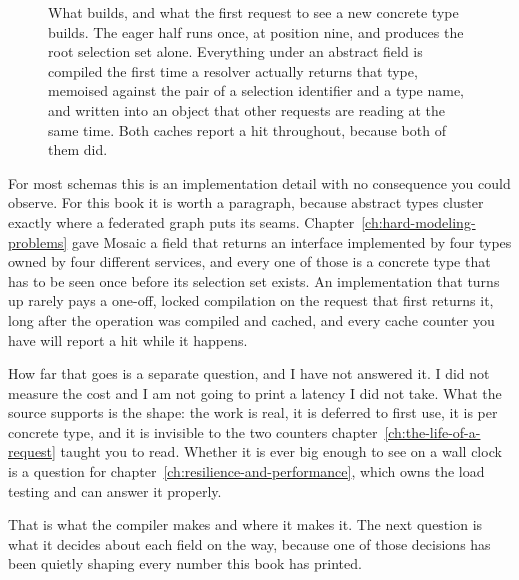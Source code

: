 \begin{figure}[htbp]
  \centering
  
  \caption{What  builds, and what the first request to see a new
  concrete type builds. The eager half runs once, at position nine, and produces
  the root selection set alone. Everything under an abstract field is compiled
  the first time a resolver actually returns that type, memoised against the
  pair of a selection identifier and a type name, and written into an object
  that other requests are reading at the same time. Both caches report a hit
  throughout, because both of them did.}
  \label{fig:ch16-lazy-compilation}
\end{figure}

%
For most schemas this is an implementation detail with no consequence you could
observe. For this book it is worth a paragraph, because abstract types cluster
exactly where a federated graph puts its seams.
Chapter~\ref{ch:hard-modeling-problems} gave Mosaic a  field that
returns an interface implemented by four types owned by four different services,
and every one of those is a concrete type that has to be seen once before its
selection set exists. An implementation that turns up rarely pays a one-off, locked
compilation on the request that first returns it, long after the operation was
compiled and cached, and every cache counter you have will report a hit while it
happens.

How far that goes is a separate question, and I have not answered it. I did not
measure the cost and I am not going to print a latency I did not take. What the source supports is the shape: the work is real, it is
deferred to first use, it is per concrete type, and it is invisible to the two
counters chapter~\ref{ch:the-life-of-a-request} taught you to read. Whether it
is ever big enough to see on a wall clock is a question for
chapter~\ref{ch:resilience-and-performance}, which owns the load testing and can
answer it properly.

\medskip
That is what the compiler makes and where it makes it. The next question is what
it decides about each field on the way, because one of those decisions has been
quietly shaping every number this book has printed.

%
